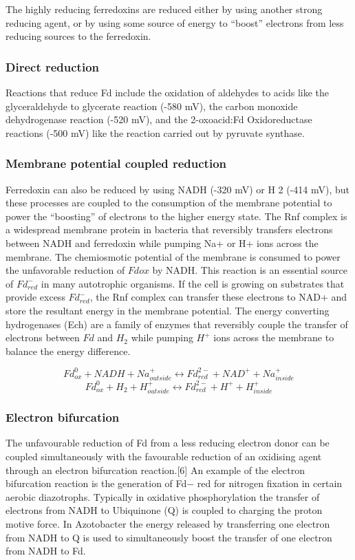 \documentclass{article}
\begin{document}
The highly reducing ferredoxins are reduced either by using another strong reducing agent,
or by using some source of energy to ``boost'' electrons from less reducing sources to the
ferredoxin.

\subsubsection{Direct reduction}
Reactions that reduce Fd include the oxidation of aldehydes to acids like the
glyceraldehyde to glycerate reaction (-580 mV), the carbon monoxide dehydrogenase reaction
(-520 mV), and the 2-oxoacid:Fd Oxidoreductase reactions (-500 mV) like the
reaction carried out by pyruvate synthase.

\subsubsection{Membrane potential coupled reduction}
Ferredoxin can also be reduced by using NADH (-320
mV) or H 2 (-414 mV), but these processes are coupled to the consumption of the membrane
potential to power the ``boosting'' of electrons to the higher energy state. The Rnf
complex is a widespread membrane protein in bacteria that reversibly transfers electrons
between NADH and ferredoxin while pumping Na+ or H+ ions across the membrane. The
chemiosmotic potential of the membrane is consumed to power the unfavorable reduction of
$Fd ox$ by NADH\@. This reaction is an essential source of $Fd_{red}^-$ in many autotrophic
organisms. If the cell is growing on substrates that provide excess $Fd_{red}^-$, the Rnf
complex can transfer these electrons to NAD+ and store the resultant energy in the
membrane potential. The energy converting hydrogenases (Ech) are a family of enzymes
that reversibly couple the transfer of electrons between $Fd$ and $H_2$ while pumping $H^+$ ions
across the membrane to balance the energy difference.

\[
    Fd_{ox}^0 + NADH + Na_{outside}^+ \leftrightarrow Fd_{red}^{2-} + NAD^+ + Na_{inside}^+
\]
\[
    Fd_{ox}^0 + H_2 + H_{outside}^+ \leftrightarrow Fd_{red}^{2-} + H^+ + H_{inside}^+
\]

\subsubsection{Electron bifurcation}
The unfavourable reduction of Fd from a less reducing electron donor can be coupled
simultaneously with the favourable reduction of an oxidising agent through an electron
bifurcation reaction.[6] An example of the electron bifurcation reaction is the generation
of Fd− red for nitrogen fixation in certain aerobic diazotrophs. Typically in oxidative
phosphorylation the transfer of electrons from NADH to Ubiquinone (Q) is coupled to
charging the proton motive force. In Azotobacter the energy released by transferring one
electron from NADH to Q is used to simultaneously boost the transfer of one electron from
NADH to Fd.
\end{document}

